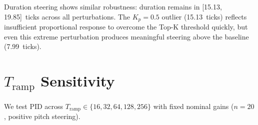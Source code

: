 \documentclass{article}
\theoremstyle{plain}
\begin{document}
\begin{table}[h]
  \caption{Duration Gain robustness ($K_p{=}1.0$, $K_i{=}0.025$).}
  \label{tab:gain_dur}
  \begin{center}
  \end{center}
\end{table}

Duration steering shows similar robustness: duration remains in [15.13, 19.85]~ticks across all perturbations. The $K_p{=}0.5$ outlier (15.13~ticks) reflects insufficient proportional response to overcome the Top-K threshold quickly, but even this extreme perturbation produces meaningful steering above the baseline (7.99~ticks).

\section{$T_\text{ramp}$ Sensitivity}
\label{app:tramp_sensitivity}

We test PID across $T_\text{ramp} \in \{16, 32, 64, 128, 256\}$ with fixed nominal gains ($n{=}20$, positive pitch steering).
\end{document}
